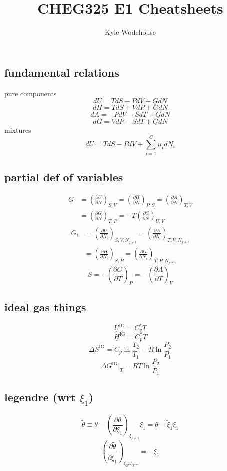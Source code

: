 \documentclass{article}
\title{\bfseries CHEG325 E1 Cheatsheets}
\author{Kyle Wodehouse}
\date{}
\begin{document}
\twocolumn
\subsection*{fundamental relations}
pure components
\[
dU = TdS - PdV + \underline{G} dN
\]
\[
dH = T dS + V dP + \underline{G} dN
\]
\[
dA = -P dV - S dT + \underline{G} dN
\]
\[
dG = V dP - S dT + \underline{G} dN
\]
mixtures 
\[
dU = T dS - P dV + \sum^C_{i=1} {\mu}_{i} dN_{i}
\]
\subsection*{partial def of variables}

\begin{align*}
\underline{G} &= \left(\frac{\partial U}{\partial N}\right)_{S,V} = \left(\frac{\partial H}{\partial N}\right)_{P,S} = \left(\frac{\partial A}{\partial N}\right)_{T,V} \\[6pt]
                &= \left(\frac{\partial G}{\partial N}\right)_{T,P} = -T\left(\frac{\partial S}{\partial N}\right)_{U,V}
\end{align*}
\begin{align*}
\bar{G}_{i}  &= \left(\frac{ \partial U }{ \partial N_{i} } \right)_{S,V,N_{j\neq i}}
                = \left(\frac{ \partial A }{ \partial N_{i} } \right)_{T,V,N_{j \neq i}} \\
                &= \left(\frac{ \partial H }{ \partial N_{i} } \right)_{S,P}
                = \left(\frac{ \partial G }{ \partial N_{i} } \right)_{T,P,N_{j \neq i}}
\end{align*}
\[
S =  -\left(\frac{ \partial G }{ \partial T } \right)_{P} = -\left(\frac{ \partial A }{ \partial T } \right)_{V} 
\]
\subsection*{ideal gas things}
\[\underline{U}^{\text{IG}}  = C_v^* T\]
\[\underline{H}^{\text{IG}}  = C_p^* T\]
\[\Delta S^{\text{IG}} = C_p \ln \frac{T_2}{T_1} - R \ln \frac{P_2}{P_1}\]
\[\Delta G^{\text{IG}} \biggl\lvert_T = RT \ln \frac{P_2}{P_1}\]
\subsection*{legendre (wrt $\xi_1$)}
\[\tilde{\theta} \equiv \theta - \left(\frac{ \partial \theta }{ \partial \xi_{1} } \right)_{\xi_{j \neq 1}} \xi_{1} = \theta - \tilde{\xi}_{1} \xi_{1}  \]
\[\left(\frac{ \partial \tilde{\theta} }{ \partial \tilde{\xi}_{1} } \right)_{\xi_{2}, \xi_{3}\dots}  = - \xi_{1}\]
\end{document}
